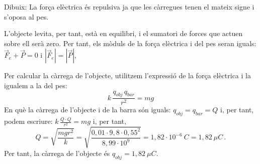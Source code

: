 \begin{solapartat}
 Dibuix: La força elèctrica és repulsiva ja que les càrregues tenen el mateix signe i s'oposa al pes.

 L'objecte levita, per tant, està en equilibri, i el sumatori de forces que actuen sobre ell serà zero. Per tant, els mòduls de la força elèctrica i del pes seran iguals: $\vec{F}_e + \vec{P} = 0$ i $|\vec{F}_e| = |\vec{P}|$,

 Per calcular la càrrega de l'objecte, utilitzem l'expressió de la força elèctrica i la igualem a la del pes:
\[ k\,\frac{q_{obj}\,q_{bar}}{r^2} = mg \]
En què la càrrega de l'objecte i de la barra són iguals: $q_{obj} = q_{bar} = Q$ i, per tant, podem escriure: $k\,\frac{Q\cdot Q}{r^2} = mg$ i, per tant,
\[ Q = \sqrt{\frac{mgr^2}{k}} = \sqrt{\frac{0,01\cdot 9,8\cdot 0,55^2}{8,99\cdot 10^{9}}} = 1,82\cdot 10^{-6}\ C = 1,82\ \mu C\,. \]
Per tant, la càrrega de l'objecte és $q_{obj} = 1,82\ \mu C$.
\end{solapartat}


